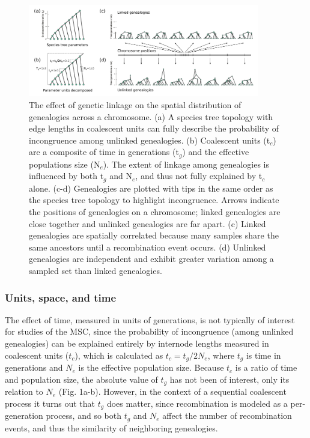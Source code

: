 \documentclass[11pt]{article}
\begin{document}
\begin{figure}
	\centering
		\includegraphics[width=0.9\textwidth]{./figures/Fig1-revision}
		\caption{
			The effect of genetic linkage on the spatial distribution of genealogies across a chromosome. (a) A species tree topology with edge lengths in coalescent units can fully describe the probability of incongruence among unlinked genealogies. (b) Coalescent units (t$_c$) are a composite of time in generations (t$_g$) and the effective populations size (N$_e$). The extent of linkage among genealogies is influenced by both t$_g$ and N$_e$, and thus not fully explained by t$_c$ alone. 
			(c-d) Genealogies are plotted with tips in the same order as the species tree topology to highlight incongruence. Arrows indicate the positions of genealogies on a chromosome; linked genealogies are close together and unlinked genealogies are far apart. (c) Linked genealogies are spatially correlated because many samples share the same ancestors until a recombination event occurs. (d) Unlinked genealogies are independent and exhibit greater variation among a sampled set than linked genealogies.
		}
		\label{fig:1}
\end{figure}


\subsubsection{Units, space, and time}
The effect of time, measured in units of generations, is not typically of interest for studies of the MSC, since the probability of incongruence (among unlinked genealogies) can be explained entirely by internode lengths measured in coalescent units ($t_c$), which is calculated as $t_{c} = t_{g} / 2N_{e}$, where $t_g$ is time in generations and $N_e$ is the effective population size. Because $t_c$ is a ratio of time and population size, the absolute value of $t_{g}$ has not been of interest, only its relation to $N_{e}$ (Fig. 1a-b). However, in the context of a sequential coalescent process it turns out that $t_{g}$ does matter, since recombination is modeled as a per-generation process, and so both $t_g$ and $N_e$ affect the number of recombination events, and thus the similarity of neighboring genealogies.
\end{document}
